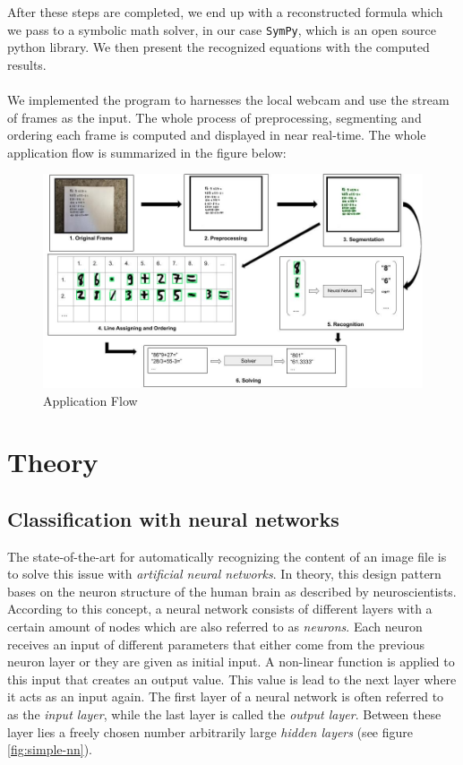\documentclass[12pt]{article}
\begin{document}
	After these steps are completed, we end up with a reconstructed formula which we pass to a symbolic math solver, in our case \texttt{SymPy}, which is an open source python library. We then present the recognized equations with the computed results.\\\\
	We implemented the program to harnesses the local webcam and use the stream of frames as the input. The whole process of preprocessing, segmenting and ordering each frame is computed and displayed in near real-time.
	The whole application flow is summarized in the figure below:
	\begin{figure}[h]
		\includegraphics[width=1\textwidth]{ImagesForReport/fulldiagram.jpg}
		\caption{Application Flow}
		\label{fig:FullFlow}
	\end{figure}

	\pagebreak\section{Theory}
	\subsection{Classification with neural networks}	
	The state-of-the-art for automatically recognizing the content of an image file is to solve this issue with \textit{artificial neural networks}. In theory, this design pattern bases on the neuron structure of the human brain as described by neuroscientists. According to this concept, a neural network consists of different layers with a certain amount of nodes which are also referred to as \textit{neurons}. Each neuron receives an input of different parameters that either come from the previous neuron layer or they are given as initial input. A non-linear function is applied to this input that creates an output value. This value is lead to the next layer where it acts as an input again. The first layer of a neural network is often referred to as the \textit{input layer}, while the last layer is called the \textit{output layer}. Between these layer lies a freely chosen number arbitrarily large \textit{hidden layers} (see figure \ref{fig:simple-nn}).
	
\end{document}
